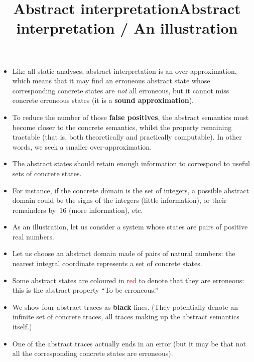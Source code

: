 \documentclass[wide]{slides}
\begin{document}
\begin{slide}
  \title{Abstract interpretation}

  \begin{itemize}

    \item Like all static analyses, abstract interpretation is an
      over\hyp{}approximation, which means that it may find an
      erroneous abstract state whose corresponding concrete states are
      \emph{not} all erroneous, but it cannot miss concrete erroneous
      states (it is a \textbf{sound approximation}).

    \item To reduce the number of those \textbf{false positives}, the
      abstract semantics must become closer to the concrete semantics,
      whilst the property remaining tractable (that is, both
      theoretically and practically computable). In other words, we
      seek a smaller over\hyp{}approximation.

    \item The abstract states should retain enough information to
      correspond to useful sets of concrete states.

    \item For instance, if the concrete domain is the set of integers,
      a possible abstract domain could be the signs of the integers
      (little information), or their remainders by~\(16\) (more
      information), etc.

  \end{itemize}

\end{slide}

\begin{slide}
  \title{Abstract interpretation / An illustration}

  \begin{itemize}

    \item As an illustration, let us consider a system whose states
      are pairs of positive real numbers.

    \item Let us choose an abstract domain made of pairs of natural
      numbers: the nearest integral coordinate represents a set of
      concrete states.

    \item Some abstract states are coloured in \textcolor{red}{red} to
      denote that they are erroneous: this is the abstract property
      ``To be erroneous.''

    \item We show four abstract traces as \textbf{black} lines. (They
      potentially denote an infinite set of concrete traces, all
      traces making up the abstract semantics itself.)

    \item One of the abstract traces actually ends in an error (but it
      may be that not all the corresponding concrete states are
      erroneous).

  \end{itemize}

\end{slide}
\end{document}
